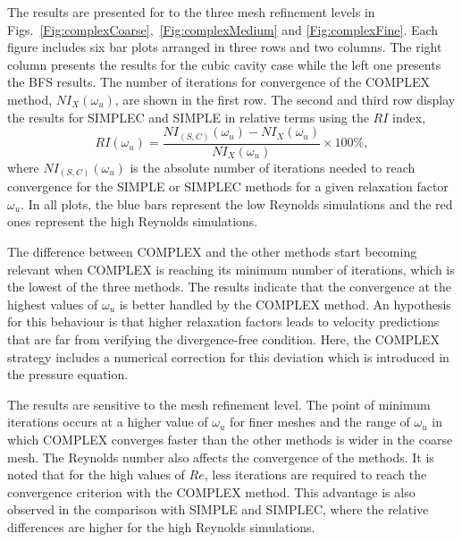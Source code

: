 \documentclass[final,3p,times,11pt,onecolumn]{myElsarticle}
\numberwithin{equation}{section}
\begin{document}
The results are presented for to the three mesh refinement levels in Figs.~\ref{Fig:complexCoarse},~\ref{Fig:complexMedium} and \ref{Fig:complexFine}. Each figure includes six bar plots arranged in three rows and two columns. The right column presents the results for the cubic cavity case while the left one presents the BFS results. The number of iterations for convergence of the COMPLEX method, $NI_X(\omega_u)$, are shown in the first row. The second and third row display the results for SIMPLEC and SIMPLE in relative terms using the $RI$ index,
\begin{equation}
RI(\omega_u)
=
\dfrac
{NI_{(S,C)}(\omega_u) - NI_X(\omega_u)}
{NI_X(\omega_u)}
\times
100\%,
\end{equation}
where $NI_{(S,C)}(\omega_u)$ is the absolute number of iterations needed to reach convergence for the SIMPLE or SIMPLEC methods for a given relaxation factor $\omega_u$. 
In all plots, the blue bars represent the low Reynolds simulations and the red ones represent the high Reynolds simulations.

The difference between COMPLEX and the other methods start becoming relevant when COMPLEX is reaching its minimum number of iterations, which is the lowest of the three methods. The results indicate that the convergence at the highest values of $\omega_u$ is better handled by the COMPLEX method. An hypothesis for this behaviour is that higher relaxation factors leads to velocity predictions that are far from verifying the divergence-free condition. Here, the COMPLEX strategy includes a numerical correction for this deviation which is introduced in the pressure equation.


The results are sensitive to the mesh refinement level. The point of minimum iterations occurs at a higher value of $\omega_u$ for finer meshes and the range of $\omega_u$ in which COMPLEX converges faster than the other methods is wider in the coarse mesh. The Reynolds number also affects the convergence of the methods. It is noted that for the high values of $Re$, less iterations are required to reach the convergence criterion with the COMPLEX method. This advantage is also observed in the comparison with SIMPLE and SIMPLEC, where the relative differences are higher for the high Reynolds simulations. %
\end{document}
